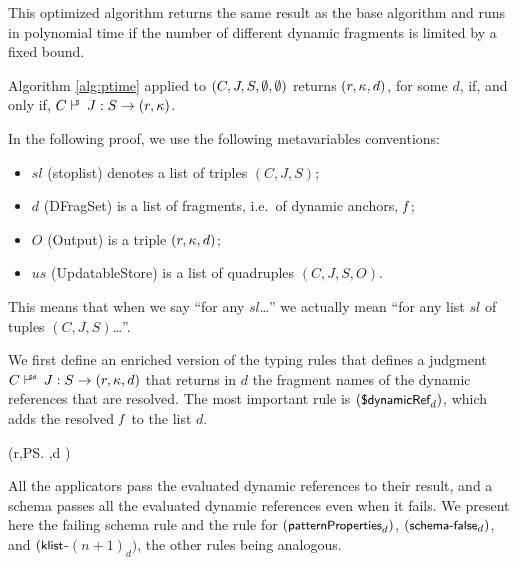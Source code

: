 This optimized algorithm returns the same result as the base algorithm and runs in polynomial time if the number of different dynamic fragments is limited by a fixed bound.

\begin{theoremrep}\label{the:ptimecorrect}
Algorithm \ref{alg:ptime} applied to $(C,J,S,\emptyset,\emptyset)$ returns $(r,\kappa,d)$, for some $d$, if, and only if,
$\SJudgCJ{S} \Ret{} (r,\pk)$.
\end{theoremrep}

\begin{appendixproof}
In the following proof, we use the following metavariables conventions:

\begin{itemize}
\item $sl$ (stoplist) denotes a list of triples $(C,J,S)$;
\item $d$ (DFragSet) is a list of fragments, i.e.\ of dynamic anchors, $\mathit{f}$;
\item $O$ (Output) is a triple $(r,\kappa,d)$;
\item $us$ (UpdatableStore) is a list of quadruples $(C,J,S,O)$.
\end{itemize}
This means that when we say ``for any $sl$\dots'' we actually mean ``for any list $sl$ of tuples $(C,J,S)$\dots''.

We first define an enriched version of the typing rules that defines a judgment
$\SdJudg{C}{J}{S}\Ret{\rl}{(r,\pk,d)}$ that returns in $d$ the fragment names of the dynamic references that are
resolved. The most important rule is $(\mbox{\sf{\small \$dynamicRef}}_d)$, which adds the resolved $\mathit{f}$ to the list $d$.

{%
 (r,\ps,d \cup {} )
}


All the applicators pass the evaluated dynamic references to their result, 
and a schema passes all the evaluated dynamic references even when it fails.
We present here the failing schema rule and the rule for $(\mbox{\sf{\small patternProperties}}_d)$,
$(\mbox{\sf{\small schema}}\mbox{\sf{\small -false}}_d)$, and $(\mbox{\sf{\small klist}}$-$(n+1)_d)$, the other rules being analogous.


\end{appendixproof}
